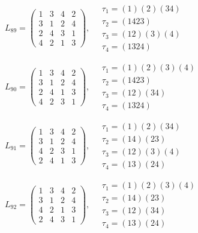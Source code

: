$L_{89} = \begin{pmatrix} 1 & 3 & 4 & 2 \\ 3 & 1 & 2 & 4 \\ 2 & 4 & 3 & 1 \\ 4 & 2 & 1 & 3 \end{pmatrix}, \quad \begin{matrix} \tau_{1} = (1)(2)(3 4) \\ \tau_{2} = (1 4 2 3) \\ \tau_{3} = (1 2)(3)(4) \\ \tau_{4} = (1 3 2 4) \end{matrix}$

$L_{90} = \begin{pmatrix} 1 & 3 & 4 & 2 \\ 3 & 1 & 2 & 4 \\ 2 & 4 & 1 & 3 \\ 4 & 2 & 3 & 1 \end{pmatrix}, \quad \begin{matrix} \tau_{1} = (1)(2)(3)(4) \\ \tau_{2} = (1 4 2 3) \\ \tau_{3} = (1 2)(3 4) \\ \tau_{4} = (1 3 2 4) \end{matrix}$

$L_{91} = \begin{pmatrix} 1 & 3 & 4 & 2 \\ 3 & 1 & 2 & 4 \\ 4 & 2 & 3 & 1 \\ 2 & 4 & 1 & 3 \end{pmatrix}, \quad \begin{matrix} \tau_{1} = (1)(2)(3 4) \\ \tau_{2} = (1 4)(2 3) \\ \tau_{3} = (1 2)(3)(4) \\ \tau_{4} = (1 3)(2 4) \end{matrix}$

$L_{92} = \begin{pmatrix} 1 & 3 & 4 & 2 \\ 3 & 1 & 2 & 4 \\ 4 & 2 & 1 & 3 \\ 2 & 4 & 3 & 1 \end{pmatrix}, \quad \begin{matrix} \tau_{1} = (1)(2)(3)(4) \\ \tau_{2} = (1 4)(2 3) \\ \tau_{3} = (1 2)(3 4) \\ \tau_{4} = (1 3)(2 4) \end{matrix}$

